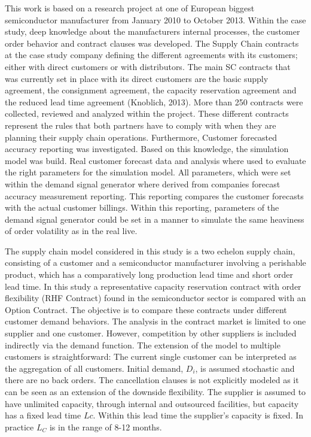 \documentclass[12pt,english]{article}
\begin{document}
This work is based on a research project at one of European biggest
semiconductor manufacturer from January 2010 to October 2013. Within
the case study, deep knowledge about the manufacturers internal processes,
the customer order behavior and contract clauses was developed. The
Supply Chain contracts at the case study company defining the different
agreements with its customers; either with direct customers or with
distributors. The main SC contracts that was currently set in place
with its direct customers are the basic supply agreement, the consignment
agreement, the capacity reservation agreement and the reduced lead
time agreement (Knoblich, 2013). More than 250 contracts were collected,
reviewed and analyzed within the project. These different contracts
represent the rules that both partners have to comply with when they
are planning their supply chain operations. Furthermore, Customer
forecasted accuracy reporting was investigated. Based on this knowledge,
the simulation model was build. Real customer forecast data and analysis
where used to evaluate the right parameters for the simulation model.
All parameters, which were set within the demand signal generator
where derived from companies forecast accuracy measurement reporting.
This reporting compares the customer forecasts with the actual customer
billings. Within this reporting, parameters of the demand signal generator
could be set in a manner to simulate the same heaviness of order volatility
as in the real live.

The supply chain model considered in this study is a two echelon supply
chain, consisting of a customer and a semiconductor manufacturer involving
a perishable product, which has a comparatively long production lead
time and short order lead time. In this study a representative capacity
reservation contract with order flexibility (RHF Contract) found in
the semiconductor sector is compared with an Option Contract. The
objective is to compare these contracts under different customer demand
behaviors. The analysis in the contract market is limited to one supplier
and one customer. However, competition by other suppliers is included
indirectly via the demand function. The extension of the model to
multiple customers is straightforward: The current single customer
can be interpreted as the aggregation of all customers. Initial demand,
$D_{i}$, is assumed stochastic and there are no back orders. The
cancellation clauses is not explicitly modeled as it can be seen as
an extension of the downside flexibility. The supplier is assumed
to have unlimited capacity, through internal and outsourced facilities,
but capacity has a fixed lead time $Lc$. Within this lead time the
supplier\textquoteright s capacity is fixed. In practice $L_{C}$
is in the range of 8-12 months.
\end{document}
